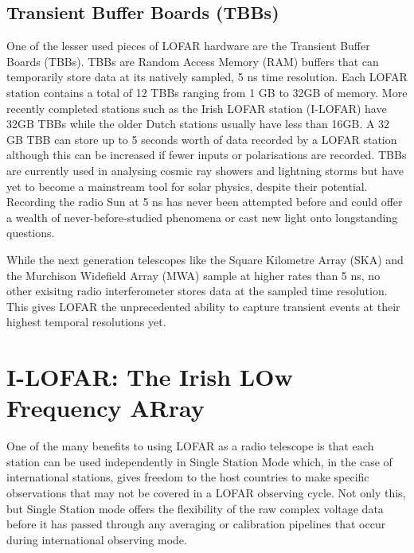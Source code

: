 \subsection{Transient Buffer Boards (TBBs)}
\label{sec:tbb}
One of the lesser used pieces of LOFAR hardware are the Transient Buffer Boards (TBBs). TBBs are Random Access Memory (RAM) buffers that can temporarily store data at its natively sampled, 5 ns time resolution. Each LOFAR station contains a total of 12 TBBs ranging from 1 GB to 32GB of memory. More recently completed stations such as the Irish LOFAR station (I-LOFAR) have 32GB TBBs while the older Dutch stations usually have less than 16GB.
A 32 GB TBB can store up to 5 seconds worth of data recorded by a LOFAR station although this can be increased if fewer inputs or polarisations are recorded. TBBs are currently used in analysing cosmic ray showers and lightning storms but have yet to become a mainstream tool for solar physics, despite their potential. 
Recording the radio Sun at 5 ns has never been attempted before and could offer a wealth of never-before-studied phenomena or cast new light onto longstanding questions.

While the next generation telescopes like the Square Kilometre Array (SKA) and the Murchison Widefield Array (MWA) sample at higher rates than 5 ns, no other exisitng radio interferometer stores data at the sampled time resolution. This gives LOFAR the unprecedented ability to capture transient events at their highest temporal resolutions yet.

\section{I-LOFAR: The Irish LOw Frequency ARray}
One of the many benefits to using LOFAR as a radio telescope is that each station can be used independently in Single Station Mode which, in the case of international stations, gives freedom to the host countries to make specific observations that may not be covered in a LOFAR observing cycle. Not only this, but Single Station mode offers the flexibility of the raw complex voltage data before it has passed through any averaging or calibration pipelines that occur during international observing mode. 

